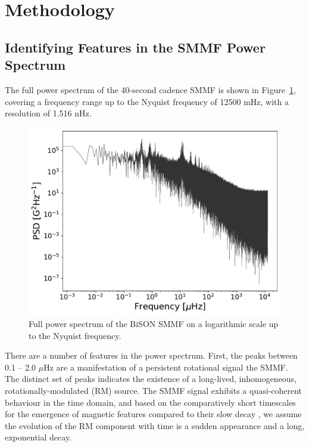 \section{Methodology}\label{sec:SMMF_method}


\subsection{Identifying Features in the SMMF Power Spectrum}

The full power spectrum of the 40-second cadence SMMF is shown in Figure~\ref{fig:BiSON_FT_full}, covering a frequency range up to the Nyquist frequency of 12500 mHz, with a resolution of 1.516 nHz. 

\begin{figure}[ht!]
	\centering
	\includegraphics[width=\columnwidth]{BiSON_SMMF_FT_full.pdf}
	\caption{Full power spectrum of the BiSON SMMF on a logarithmic scale up to the Nyquist frequency.}
	\label{fig:BiSON_FT_full}
\end{figure}

There are a number of features in the power spectrum. First, the peaks between 0.1 -- 2.0 $\mu\mathrm{Hz}$ are a manifestation of a persistent rotational signal the SMMF. The distinct set of peaks indicates the existence of a long-lived, inhomogeneous, rotationally-modulated (RM) source. The SMMF signal exhibits a quasi-coherent behaviour in the time domain, and based on the comparatively short timescales for the emergence of magnetic features compared to their slow decay \citep{zwaan_solar_1981, harvey_properties_1993, hathaway_sunspot_2008}, we assume the evolution of the RM component with time is a sudden appearance and a long, exponential decay.

